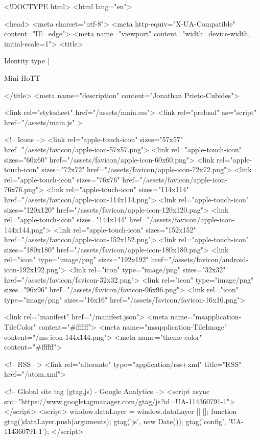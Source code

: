 <!DOCTYPE html>
<html lang="en">

<head>
  <meta charset="utf-8">
  <meta http-equiv="X-UA-Compatible" content="IE=edge">
  <meta name="viewport" content="width=device-width, initial-scale=1">
  <title>
    
      
        Identity type |
      
        Mini-HoTT
    
  </title>
  <meta name="description" content="Jonathan Prieto-Cubides">

  <link rel="stylesheet" href="/assets/main.css">
  <link rel="preload" as="script" href="/assets/main.js" >

  <!-- Icons -->
  <link rel="apple-touch-icon" sizes="57x57" href="/assets/favicon/apple-icon-57x57.png">
  <link rel="apple-touch-icon" sizes="60x60" href="/assets/favicon/apple-icon-60x60.png">
  <link rel="apple-touch-icon" sizes="72x72" href="/assets/favicon/apple-icon-72x72.png">
  <link rel="apple-touch-icon" sizes="76x76" href="/assets/favicon/apple-icon-76x76.png">
  <link rel="apple-touch-icon" sizes="114x114" href="/assets/favicon/apple-icon-114x114.png">
  <link rel="apple-touch-icon" sizes="120x120" href="/assets/favicon/apple-icon-120x120.png">
  <link rel="apple-touch-icon" sizes="144x144" href="/assets/favicon/apple-icon-144x144.png">
  <link rel="apple-touch-icon" sizes="152x152" href="/assets/favicon/apple-icon-152x152.png">
  <link rel="apple-touch-icon" sizes="180x180" href="/assets/favicon/apple-icon-180x180.png">
  <link rel="icon" type="image/png" sizes="192x192"  href="/assets/favicon/android-icon-192x192.png">
  <link rel="icon" type="image/png" sizes="32x32" href="/assets/favicon/favicon-32x32.png">
  <link rel="icon" type="image/png" sizes="96x96" href="/assets/favicon/favicon-96x96.png">
  <link rel="icon" type="image/png" sizes="16x16" href="/assets/favicon/favicon-16x16.png">

  <link rel="manifest" href="/manifest.json">
  <meta name="msapplication-TileColor" content="#ffffff">
  <meta name="msapplication-TileImage" content="/ms-icon-144x144.png">
  <meta name="theme-color" content="#ffffff">

  <!-- RSS -->
  <link rel="alternate" type="application/rss+xml" title="RSS" href="/atom.xml">

  <!-- Global site tag (gtag.js) - Google Analytics -->
  <script async src="https://www.googletagmanager.com/gtag/js?id=UA-114360791-1"></script>
  <script>
    window.dataLayer = window.dataLayer || [];
    function gtag(){dataLayer.push(arguments);}
    gtag('js', new Date());
    gtag('config', 'UA-114360791-1');
  </script>

